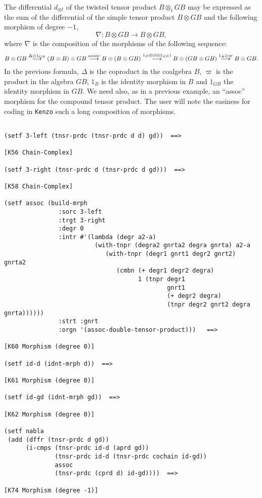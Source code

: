 The differential $d_{\otimes t}$ of the twisted tensor product $B \otimes_t GB$ may be expressed as the sum
of the differential of the simple tensor product $B \otimes GB$ and the following morphism of degree $-1$,
$$\nabla: B \otimes GB \longrightarrow B \otimes GB,$$
where $\nabla$ is the composition of the morphisms of the following sequence:
$$B\otimes GB \buildrel {\Delta\otimes 1_{GB}} \over \longrightarrow  (B\otimes B) \otimes GB
              \buildrel {assoc} \over \longrightarrow  B \otimes (B \otimes GB)
              \buildrel {1_B \otimes (t \otimes 1_{GB})} \over \longrightarrow  B \otimes (GB \otimes GB)
              \buildrel {1_B \otimes \varpi} \over \longrightarrow B \otimes GB.$$
In the previous formula, $\Delta$ is the coproduct in the coalgebra $B$, $\varpi$ is the
product in the algebra $GB$, $1_B$ is the identity morphism in $B$ and $1_{GB}$ the identity morphism
in $GB$. We need also, as in a previous example, an ``assoc'' morphism for
the compound tensor product. The user will note the easiness for coding in {\tt Kenzo} such
a long composition of morphisms.
{\footnotesize\begin{verbatim}

(setf 3-left (tnsr-prdc (tnsr-prdc d d) gd))  ==>

[K56 Chain-Complex]

(setf 3-right (tnsr-prdc d (tnsr-prdc d gd)))  ==>

[K58 Chain-Complex]

(setf assoc (build-mrph
               :sorc 3-left
               :trgt 3-right
               :degr 0
               :intr #'(lambda (degr a2-a) 
                         (with-tnpr (degra2 gnrta2 degra gnrta) a2-a
                            (with-tnpr (degr1 gnrt1 degr2 gnrt2) gnrta2
                               (cmbn (+ degr1 degr2 degra) 
                                     1 (tnpr degr1 
                                             gnrt1 
                                             (+ degr2 degra) 
                                             (tnpr degr2 gnrt2 degra gnrta))))))
               :strt :gnrt
               :orgn '(assoc-double-tensor-product)))   ==>

[K60 Morphism (degree 0)]

(setf id-d (idnt-mrph d))  ==>

[K61 Morphism (degree 0)]

(setf id-gd (idnt-mrph gd))  ==>

[K62 Morphism (degree 0)]

(setf nabla 
 (add (dffr (tnsr-prdc d gd))
      (i-cmps (tnsr-prdc id-d (aprd gd))
              (tnsr-prdc id-d (tnsr-prdc cochain id-gd))
              assoc
              (tnsr-prdc (cprd d) id-gd))))  ==>

[K74 Morphism (degree -1)]
\end{verbatim}}
